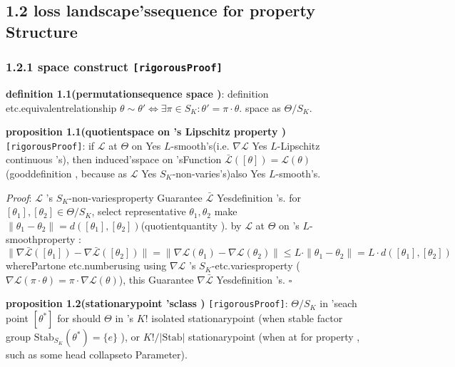 \documentclass[
  12pt,
]{article}
\begin{document}
\subsection{1.2
loss landscape'ssequence for property Structure}\label{ux635fux5931ux666fux89c2ux7684ux6392ux5217ux5bf9ux79f0ux6027ux7ed3ux6784}

\subsubsection{\texorpdfstring{1.2.1 space construct 
\texttt{{[}rigorousProof{]}}}{1.2.1 space construct  {[}rigorousProof{]}}}\label{ux5546ux7a7aux95f4ux6784ux9020-ux4e25ux683cux8bc1ux660e}

\textbf{definition  1.1(permutationsequence space )}: definition etc.equivalentrelationship 
\(\theta \sim \theta' \iff \exists \pi \in S_K : \theta' = \pi \cdot \theta\). space as 
\(\Theta / S_K\). 

\textbf{proposition 1.1(quotientspace on 's Lipschitz property )}
\texttt{{[}rigorousProof{]}}: if  \(\mathcal{L}\) at  \(\Theta\) on Yes
\(L\)-smooth's(i.e. \(\nabla\mathcal{L}\) Yes \(L\)-Lipschitz
continuous 's), then induced'sspace on 'sFunction
\(\bar{\mathcal{L}}([\theta]) = \mathcal{L}(\theta)\)(gooddefinition , because as 
\(\mathcal{L}\) Yes \(S_K\)-non-varies's)also Yes \(L\)-smooth's. 

\emph{Proof}: \(\mathcal{L}\) 's \(S_K\)-non-variesproperty Guarantee \(\bar{\mathcal{L}}\)
Yesdefinition 's. for  \([\theta_1], [\theta_2] \in \Theta/S_K\), select representative
\(\theta_1, \theta_2\) make 
\(\|\theta_1 - \theta_2\| = d([\theta_1], [\theta_2])\)(quotientquantity ). by 
\(\mathcal{L}\) at  \(\Theta\) on 's \(L\)-smoothproperty : 
\[\|\nabla\bar{\mathcal{L}}([\theta_1]) - \nabla\bar{\mathcal{L}}([\theta_2])\| = \|\nabla\mathcal{L}(\theta_1) - \nabla\mathcal{L}(\theta_2)\| \leq L \cdot \|\theta_1 - \theta_2\| = L \cdot d([\theta_1], [\theta_2])\]
wherePartone etc.numberusing using  \(\nabla\mathcal{L}\) 's
\(S_K\)-etc.variesproperty (\(\nabla\mathcal{L}(\pi \cdot \theta) = \pi \cdot \nabla\mathcal{L}(\theta)\)), this Guarantee
\(\nabla\bar{\mathcal{L}}\) Yesdefinition 's. \(\square\)

\textbf{proposition 1.2(stationarypoint 'sclass )}
\texttt{{[}rigorousProof{]}}: \(\Theta / S_K\) in 'seach point  \([\theta^*]\)
for should  \(\Theta\) in 's \(K!\) isolated stationarypoint (when stable factor group 
\(\text{Stab}_{S_K}(\theta^*) = \{e\}\) ), or  \(K! / |\text{Stab}|\)
stationarypoint (when at for property , such as some head collapseto Parameter). 
\end{document}
